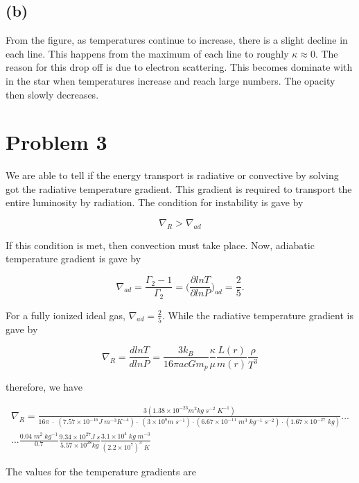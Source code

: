 \documentclass[11pt]{article}
\begin{document}
\subsection*{(b)}

From the figure, as temperatures continue to increase, there is a slight decline in each line. This happens from the maximum of each line to roughly $\kappa \approx 0$. The reason for this drop off is due to electron scattering. This becomes dominate with in the star when temperatures increase and reach large numbers. The opacity then slowly decreases. 

\clearpage

\section*{Problem 3}

We are able to tell if the energy transport is radiative or convective by solving got the radiative temperature gradient. This gradient is required to transport the entire luminosity by radiation. The condition for instability is gave by

$$
\nabla_{R} > \nabla_{ad}
$$

If this condition is met, then convection must take place. Now, adiabatic temperature gradient is gave by

$$
\nabla_{ad} = \frac{\Gamma_{2} - 1}{\Gamma_{2}} = \Bigg(\frac{\partial ln T}{\partial ln P}\Bigg)_{ad} = \frac{2}{5}.
$$

For a fully ionized ideal gas, $\nabla_{ad} = \frac{2}{5}$. While the radiative temperature gradient is gave by

$$
\nabla_{R} = \frac{d ln T}{d ln P} = \frac{3k_{B}}{16\pi a c G m_{p}} \frac{\kappa}{\mu} \frac{L(r)}{m(r)} \frac{\rho}{T^{3}}
$$

therefore, we have

\begin{gather*}
    \nabla_{R} = \frac{3(1.38 \times 10^{-23} m^{2} kg \; s^{-2} \; K^{-1})}{16\pi \; \cdot \; (7.57 \times 10^{-16} J \; m^{-3} K^{-4}) \cdot \; (3 \times 10^{8} m \; s^{-1}) \cdot (6.67 \times 10^{-11} \; m^{3} \; kg^{-1} \; s^{-2}) \cdot (1.67 \times 10^{-27} \; kg)} ...\\ ...\frac{0.04 \; m^{2} \; kg^{-1}}{0.7} \frac{9.34 \times 10^{27} J \; s}{5.57 \times 10^{28} kg} \frac{3.1 \times 10^{4} \; kg \; m^{-3}}{(2.2 \times 10^{7})^{3} \; K}
\end{gather*} 


The values for the temperature gradients are
\end{document}
